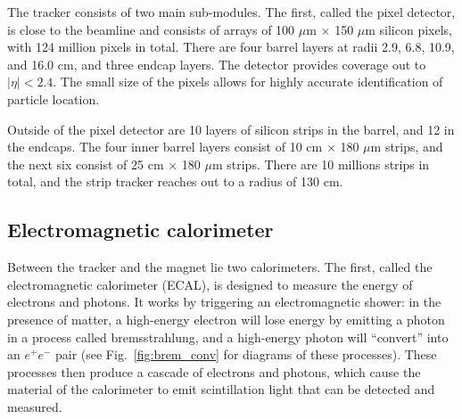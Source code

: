 
The tracker consists of two main sub-modules. The first, called the pixel detector, 
is close to the beamline and consists of arrays of 100 $\mu$m $\times$ 150 $\mu$m
silicon pixels, with 124 million pixels in total.
There are four barrel layers at radii 2.9, 6.8, 10.9, and 16.0 cm,
and three endcap layers. The detector provides coverage out to $|\eta|<2.4$.
The small size of the pixels allows for highly accurate identification of particle location.

Outside of the pixel detector are 10 layers of silicon strips in the barrel, and 12 in the
endcaps. The four inner barrel layers
consist of 10 cm $\times$ 180 $\mu$m strips, and the next six consist of 
25 cm $\times$ 180 $\mu$m strips. There are 10 millions strips in total,
and the strip tracker reaches out to a radius of 130 cm.

\subsection{Electromagnetic calorimeter}

Between the tracker and the magnet lie two calorimeters. The first,
called the electromagnetic calorimeter (ECAL), is designed to
measure the energy of electrons and photons. It works by triggering
an electromagnetic shower: in the presence of matter, 
a high-energy electron will lose energy by emitting a photon
in a process called bremsstrahlung, and a high-energy photon
will ``convert'' into an $e^+e^-$ pair (see Fig.~\ref{fig:brem_conv}
for diagrams of these processes). These processes then produce a
cascade of electrons and photons, which cause the material of the calorimeter
to emit scintillation light that can be detected and measured.

